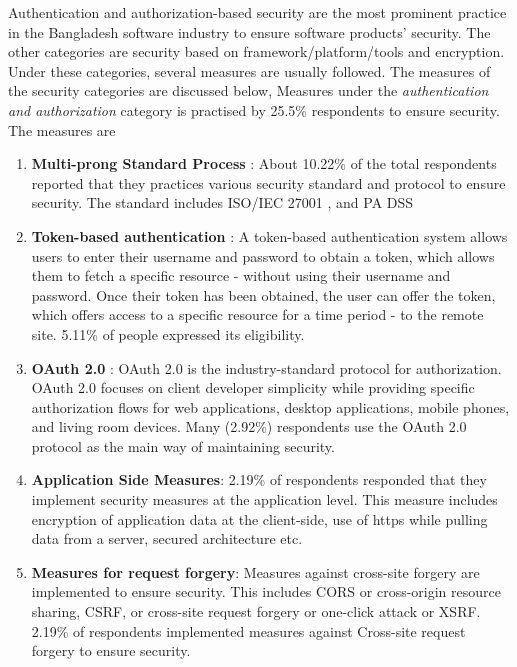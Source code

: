 Authentication and authorization-based security are the most prominent practice in the Bangladesh software industry to ensure software products' security. The other categories are security based on framework/platform/tools and encryption. Under these categories, several measures are usually followed. The measures of the security categories are discussed below,
Measures under the \emph{authentication and authorization} category is practised by 25.5\% respondents to ensure security. The measures are 
\begin{enumerate}[label=(\alph*)]

    \item \textbf{Multi-prong Standard Process} : About 10.22\% of the total respondents reported that they practices various security standard and protocol to ensure security. The standard includes ISO/IEC 27001 , and PA DSS
    
    \item \textbf{Token-based authentication} : A token-based authentication system allows users to enter their username and password to obtain a token, which allows them to fetch a specific resource - without using their username and password. Once their token has been obtained, the user can offer the token, which offers access to a specific resource for a time period - to the remote site. 5.11\% of people expressed its eligibility.
    
    \item \textbf{OAuth 2.0} : OAuth 2.0 is the industry-standard protocol for authorization. OAuth 2.0 focuses on client developer simplicity while providing specific authorization flows for web applications, desktop applications, mobile phones, and living room devices. Many (2.92\%) respondents use the OAuth 2.0 protocol as the main way of maintaining security.
    
    \item \textbf{Application Side Measures}: 2.19\% of respondents responded that they implement security measures at the application level. This measure includes encryption of application data at the client-side, use of https while pulling data from a server, secured architecture etc.
    
    \item \textbf{Measures for request forgery}: Measures against cross-site forgery are implemented to ensure security. This includes CORS or cross-origin resource sharing, CSRF, or cross-site request forgery or one-click attack or XSRF. 2.19\% of respondents implemented measures against  Cross-site request forgery to ensure security.
    

\end{enumerate}
